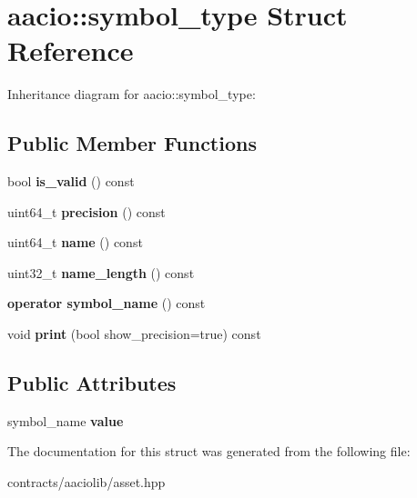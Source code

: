 \hypertarget{structaacio_1_1symbol__type}{}\section{aacio\+:\+:symbol\+\_\+type Struct Reference}
\label{structaacio_1_1symbol__type}


Inheritance diagram for aacio\+:\+:symbol\+\_\+type\+:
\subsection*{Public Member Functions}
\begin{DoxyCompactItemize}
\item 
\mbox{\label{structaacio_1_1symbol__type_a9b5a9a182fd3a2fc2f2a1f8048b1b075}} 
bool {\bfseries is\+\_\+valid} () const
\item 
\mbox{\label{structaacio_1_1symbol__type_a83f848825aa929b2d985d6e8621a3164}} 
uint64\+\_\+t {\bfseries precision} () const
\item 
\mbox{\label{structaacio_1_1symbol__type_af5b668c22378e5e4071ddd751fb1bb65}} 
uint64\+\_\+t {\bfseries name} () const
\item 
\mbox{\label{structaacio_1_1symbol__type_a52c5c32493b8194824bcdfb2bc1ecf77}} 
uint32\+\_\+t {\bfseries name\+\_\+length} () const
\item 
\mbox{\label{structaacio_1_1symbol__type_a9c03cf5e20ffd5685fe21a25e6ea072d}} 
{\bfseries operator symbol\+\_\+name} () const
\item 
\mbox{\label{structaacio_1_1symbol__type_aafcd85f28f9e419369348ed71171f74c}} 
void {\bfseries print} (bool show\+\_\+precision=true) const
\end{DoxyCompactItemize}
\subsection*{Public Attributes}
\begin{DoxyCompactItemize}
\item 
\mbox{\label{structaacio_1_1symbol__type_a446318f7941a87e10713862fcf8c3721}} 
symbol\+\_\+name {\bfseries value}
\end{DoxyCompactItemize}


The documentation for this struct was generated from the following file\+:\begin{DoxyCompactItemize}
\item 
contracts/aaciolib/asset.\+hpp\end{DoxyCompactItemize}
